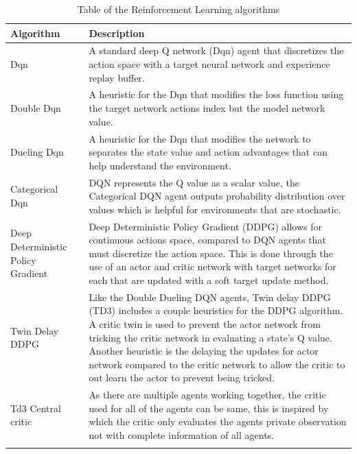 \begin{longtable}{|p{5cm}|p{10cm}|} \hline
    \textbf{Algorithm} & \textbf{Description} \\ \hline
    Dqn~\citep{mnih2015humanlevel} & A standard deep Q network (Dqn) agent that discretizes the action space with a
        target neural network and experience replay buffer. \\ \hline
    Double Dqn~\citep{doubledqn} & A heuristic for the Dqn that modifies the loss function using the target network
        actions index but the model network value. \\ \hline
    Dueling Dqn~\citep{duelingdqn} & A heuristic for the Dqn that modifies the network to separates the state value
        and action advantages that can help understand the environment. \\ \hline
    Categorical Dqn~\citep{distributional_dqn} & DQN represents the Q value as a scalar value, the Categorical DQN agent
        outputs probability distribution over values which is helpful for environments that are stochastic. \\ \hline
    Deep Deterministic Policy Gradient~\citep{ddpg} & Deep Deterministic Policy Gradient (DDPG) allows for continuous
        actions space, compared to DQN agents that must discretize the action space. This is done through the use of an
        actor and critic network with target networks for each that are updated with a soft target update method. \\ \hline
    Twin Delay DDPG~\citep{td3} & Like the Double Dueling DQN agents, Twin delay DDPG (TD3) includes a couple
        heuristics for the DDPG algorithm. A critic twin is used to prevent the actor network from tricking the critic
        network in evaluating a state's Q value. Another heuristic is the delaying the updates for actor network
        compared to the critic network to allow the critic to out learn the actor to prevent being tricked.\\ \hline
    Td3 Central critic & As there are multiple agents working together, the critic used for all of the agents can be
        same, this is inspired by~\cite{maddpg} which the critic only evaluates the agents private observation not with
        complete information of all agents. \\ \hline
    \caption{Table of the Reinforcement Learning algorithms}
    \label{tab:reinforcement-learning-algorithms}
\end{longtable}

